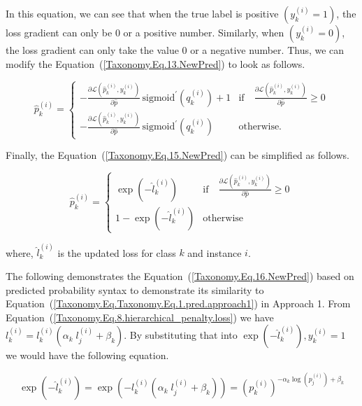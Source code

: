 In this equation, we can see that when the true label is positive $\left(y_k^{(i)}=1\right) $, the loss gradient can only be 0 or a positive number. Similarly, when $\left(y_k^{(i)}=0\right) $, the loss gradient can only take the value 0 or a negative number. Thus, we can modify the Equation~(\ref{Taxonomy.Eq.13.NewPred})  to look as follows.

\begin{equation}
    \label{Taxonomy.Eq.15.NewPred}
    \widehat{p}_k^{(i)} =
    \begin{cases}
        -\frac{\partial \mathcal{L}(\widehat{p}_k^{(i)}, y_k^{(i)})}{\partial \widehat{p}} \, \text{sigmoid}^{\prime}(q_k^{(i)}) + 1 & \text{if} \quad \frac{\partial \mathcal{L}(\widehat{p}_k^{(i)}, y_k^{(i)})}{\partial \widehat{p}} \geq 0 \\
        -\frac{\partial \mathcal{L}(\widehat{p}_k^{(i)}, y_k^{(i)})}{\partial \widehat{p}} \, \text{sigmoid}^{\prime}(q_k^{(i)}) & \text{otherwise.}
    \end{cases}
\end{equation}

Finally, the Equation~(\ref{Taxonomy.Eq.15.NewPred}) can be simplified as follows.



\begin{equation}
    \label{Taxonomy.Eq.16.NewPred}
    \widehat{p}_k^{(i)} =
    \begin{cases}
        \exp(-\widehat{l}_k^{(i)}) & \text{if} \quad \frac{\partial \mathcal{L}(\widehat{p}_k^{(i)}, y_k^{(i)})}{\partial \widehat{p}} \geq 0 \\
        1 - \exp(-\widehat{l}_k^{(i)}) & \text{otherwise}
    \end{cases}
\end{equation}

where, ${\widehat l}_k^{(i)} $ is the updated loss for class $k $ and instance $i $.

The following demonstrates the Equation~(\ref{Taxonomy.Eq.16.NewPred})  based on predicted probability syntax to demonstrate its similarity to Equation~(\ref{Taxonomy.Eq.Taxonomy.Eq.1.pred.approach1})  in Approach 1. From Equation~(\ref{Taxonomy.Eq.8.hierarchical_penalty.loss}) we have $l_k^{(i)}=l_k^{(i)}\left(\alpha_k\;l_j^{(i)}+\beta_k\right) $. By substituting that into $\exp{\left(-\widehat{l}_{k}^{(i)}\right)}, y_{k}^{(i)}=1 $ we would have the following equation.


\begin{equation}
    \label{Taxonomy.Eq.17}
    \exp{\left(-{\widehat l}_k^{(i)}\right)}=\exp{\left(-l_k^{(i)}\left(\alpha_k\;l_j^{(i)}+\beta_k\right)\right)}={\left(p_k^{(i)}\right)}^{-\alpha_k{\log{\left(p_j^{(i)}\right)}}+\beta_k}
\end{equation}


